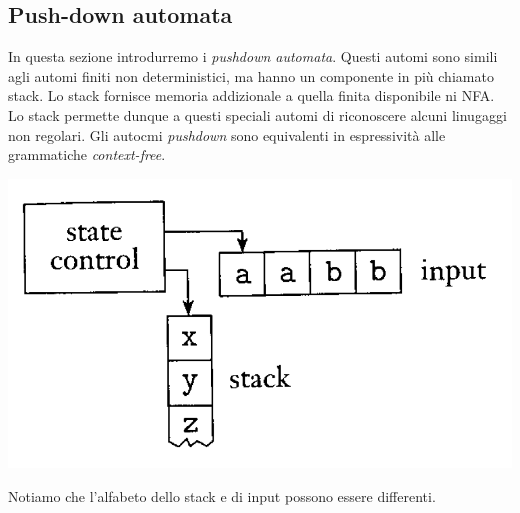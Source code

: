 \documentclass[italian]{article}
\begin{document}
\pagebreak
\subsection{Push-down automata}
In questa sezione introdurremo i \textit{pushdown automata}. Questi automi sono simili agli automi finiti non deterministici, ma hanno un componente in più chiamato stack. Lo stack fornisce memoria addizionale a quella finita disponibile ni NFA. Lo stack permette dunque a questi speciali automi di riconoscere alcuni linugaggi non regolari. Gli autocmi \textit{pushdown} sono equivalenti in espressività alle grammatiche \textit{context-free}.
\begin{center}
	\includegraphics[width=0.4\linewidth]{images/pushdown_automata}
\end{center}
Notiamo che l'alfabeto dello stack e di input possono essere differenti.
\end{document}
